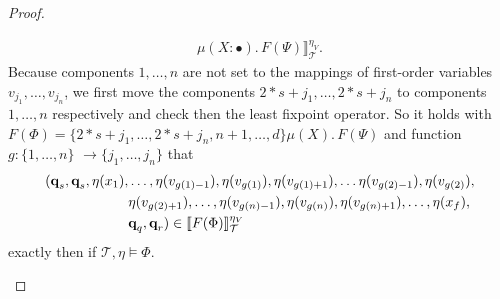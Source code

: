 \begin{proof}
\begin{compactitem}
\begin{align*}
         \mu(X\colon \bullet).\,F(\Psi) \rrbracket^{\eta_V}_\mathcal{T}.
         \end{align*}
       Because components $1, \dots, n$ are not set to the mappings of first-order variables 
       $v_{j_1}, \dots, v_{j_n}$, we first move the components $2*s+j_1, \dots, 2*s+j_n$ to components $1, \dots, n$ respectively and check then the least fixpoint operator.
        So it holds with $F(\Phi) = \{2*s+j_1, \dots, 2*s+j_n, n+1, \dots, d\} \mu (X).\, F(\Psi)$ and
        function $g: \{1, \dots, n\} $ $\rightarrow \{j_1, \dots, j_n\}$ that
        \begin{align*}
            (\emph{q}_s, \emph{q}_s, \eta(x_1),& \dots, \eta(v_{g(1)-1}), \eta(v_{g(1)}), \eta(v_{g(1)+1}), \dots \eta(v_{g(2)-1}), \eta
            (v_{g(2)}),\\& \eta(v_{g(2)+1}), \dots, \eta(v_{g(n)-1}), \eta(v_{g(n)}), \eta(v_{g(n)+1}), \dots, \eta
            (x_f),\\& \emph{q}_q, \emph{q}_r) \in \llbracket  F(\Phi) \rrbracket^{\eta_V
            }_\mathcal{T}
        \end{align*}
        exactly then if $\mathcal{T}, \eta \models \Phi$.


\end{compactitem}
\end{proof}
